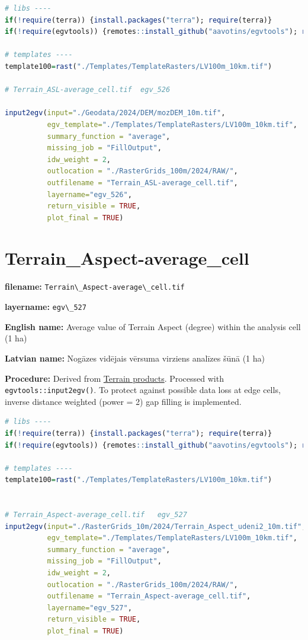 \documentclass[
]{book}
\newcommand{\passthrough}[1]{#1}
\begin{document}
\begin{lstlisting}[language=R]
# libs ----
if(!require(terra)) {install.packages("terra"); require(terra)}
if(!require(egvtools)) {remotes::install_github("aavotins/egvtools"); require(egvtools)}

# templates ----
template100=rast("./Templates/TemplateRasters/LV100m_10km.tif")

# Terrain_ASL-average_cell.tif  egv_526

input2egv(input="./Geodata/2024/DEM/mozDEM_10m.tif",
          egv_template="./Templates/TemplateRasters/LV100m_10km.tif",
          summary_function = "average",
          missing_job = "FillOutput",
          idw_weight = 2,
          outlocation = "./RasterGrids_100m/2024/RAW/",
          outfilename = "Terrain_ASL-average_cell.tif",
          layername="egv_526",
          return_visible = TRUE,
          plot_final = TRUE)
\end{lstlisting}

\section{Terrain\_Aspect-average\_cell}\label{ch06.527}

\textbf{filename:} \passthrough{\lstinline!Terrain\_Aspect-average\_cell.tif!}

\textbf{layername:} \passthrough{\lstinline!egv\_527!}

\textbf{English name:} Average value of Terrain Aspect (degree) within the analysis cell (1 ha)

\textbf{Latvian name:} Nogāzes vidējais vērsuma virziens analīzes šūnā (1 ha)

\textbf{Procedure:} Derived from \hyperref[Ch05.01]{Terrain products}. Processed
with \passthrough{\lstinline!egvtools::input2egv()!}. To protect against
possible data loss at edge cells, inverse distance weighted (power = 2) gap filling
is implemented.

\begin{lstlisting}[language=R]
# libs ----
if(!require(terra)) {install.packages("terra"); require(terra)}
if(!require(egvtools)) {remotes::install_github("aavotins/egvtools"); require(egvtools)}

# templates ----
template100=rast("./Templates/TemplateRasters/LV100m_10km.tif")


# Terrain_Aspect-average_cell.tif   egv_527
input2egv(input="./RasterGrids_10m/2024/Terrain_Aspect_udeni2_10m.tif",
          egv_template="./Templates/TemplateRasters/LV100m_10km.tif",
          summary_function = "average",
          missing_job = "FillOutput",
          idw_weight = 2,
          outlocation = "./RasterGrids_100m/2024/RAW/",
          outfilename = "Terrain_Aspect-average_cell.tif",
          layername="egv_527",
          return_visible = TRUE,
          plot_final = TRUE)
\end{lstlisting}
\end{document}
